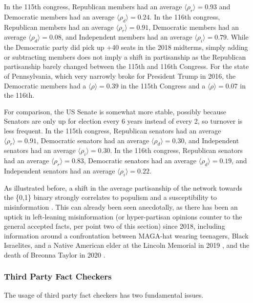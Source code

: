 \documentclass[preprint,review,12pt]{elsarticle}
\begin{document}
 In the 115th congress, Republican members had an average $\langle \rho_r \rangle = 0.93$ and Democratic members had an average $\langle \rho_d \rangle = 0.24$. In the 116th congress, Republican members had an average $\langle \rho_r \rangle = 0.91$, Democratic members had an average $\langle \rho_d \rangle = 0.08$, and Independent members had an average $\langle \rho_i \rangle = 0.79$. While the Democratic party did pick up +40 seats in the 2018 midterms, simply adding or subtracting members does not imply a shift in partisanship as the Republican partisanship barely changed between the 115th and 116th Congress. For the state of Pennsylvania, which very narrowly broke for President Trump in 2016, the Democratic members had a $\langle \rho \rangle = 0.39$ in the 115th Congress and a $\langle \rho \rangle= 0.07$ in the 116th.
 
 For comparison, the US Senate is somewhat more stable, possibly because Senators are only up for election every 6 years instead of every 2, so turnover is less frequent. In the 115th congress, Republican senators had an average $\langle \rho_r \rangle = 0.91$, Democratic senators had an average $\langle \rho_d \rangle = 0.30$, and Independent senators had an average $\langle \rho_i \rangle = 0.30$. In the 116th congress, Republican senators had an average $\langle \rho_r \rangle = 0.83$, Democratic senators had an average $\langle \rho_d \rangle = 0.19$, and Independent senators had an average $\langle \rho_i \rangle = 0.22$.
 
 As illustrated before, a shift in the average partisanship of the network towards the \{0,1\} binary strongly correlates to populism and a susceptibility to misinformation \cite{hopp2020people,kahan2012ideology,mourao2019fake,shin2017partisan,swire2017processing,vargo2018agenda}. This can already been seen anecdotally, as there has been an uptick in left-leaning misinformation (or hyper-partisan opinions counter to the general accepted facts, per point two of this section)  since 2018, including information around a confrontation between MAGA-hat wearing teenagers, Black Israelites, and a Native American elder at the Lincoln Memorial in 2019 \cite{sacks2019maga,healy2019believing,pond2020complexity}, and the death of Breonna Taylor in 2020 \cite{duvall2020fact,kim2020fact}. 

 \subsubsection{Third Party Fact Checkers}
  \label{Third Party Fact Checkers Sections}
 The usage of third party fact checkers has two fundamental issues.
 
\end{document}
